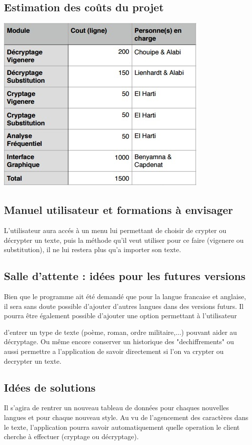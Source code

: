 \documentclass[a4]{article}
\begin{document}
		\subsection{Estimation des coûts du projet}
		\begin{center}\includegraphics[scale=0.5]{Tableau_cout.jpg}\end{center} 
		\subsection{Manuel utilisateur et formations à envisager}
			L'utilisateur aura accés à un menu lui permettant de choisir de crypter ou décrypter un texte,
			puis la méthode qu'il veut utiliser pour ce faire (vigenere ou substitution), il ne lui restera 
			plus qu'a importer son texte.
		\subsection{Salle d’attente : idées pour les futures versions}
			Bien que le programme ait été demandé que pour la langue francaise et anglaise, 
			il sera sans doute possible d'ajouter d'autres langues dans des versions futurs. 
			Il pourra être également possible d'ajouter une option permettant à l'utilisateur

			d'entrer un type de texte (poème, roman, ordre militaire,...) pouvant aider au décryptage. Ou même encore conserver un historique des "dechiffrements" ou aussi permettre a l'application de savoir directement si l'on va crypter ou decrypter un texte.

		\subsection{Idées de solutions}
		 	Il s'agira de rentrer un nouveau tableau de données pour chaques nouvelles langues et pour chaque nouveau style.
			Au vu de l'agencement des caractères dans le texte, l'application pourra savoir automatiquement quelle operation le client cherche à effectuer (cryptage ou décryptage).
			
\end{document}
